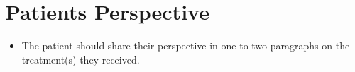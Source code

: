 
\section{Patients Perspective}
\begin{itemize}
    \item The patient should share their perspective in one to two paragraphs on the treatment(s) they received.
    
\end{itemize}